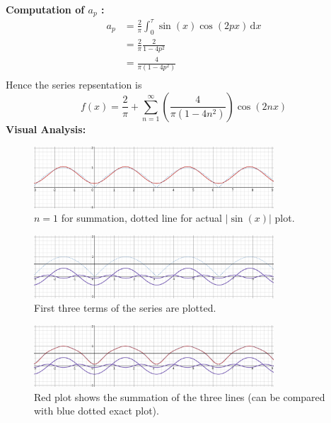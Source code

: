 \documentclass[letterpaper]{article}
\begin{document}
\textbf{Computation of $a_p$ : }
\begin{align*} a_p &=  \frac{2}{\pi }
	\int_{0}^{\tau} \sin(x) \cos(2 p x) \, \mathrm{d}  x   \\
	&= \frac{2}{\pi } \frac{2}{1 - 4p^2} \\
	&= \frac{4}{\pi (1 - 4 p^2)} \\
\end{align*}
Hence the series repsentation is 
\[
\boxed{
f(x) = \frac{2}{ \pi } + \sum_{n=1}^{\infty} \left(\frac{4}{\pi (1- 4n^2 )}\right) \cos(2 n x)
}
\] 
\textbf{Visual Analysis: }
\begin{figure}[H]
	\centering
	\includegraphics[width=0.8\textwidth]{ss/5/p1-1.png}
	\caption{$n = 1$ for summation, dotted line for actual $| \sin(x) |$ plot.}
	\label{fig:ss-5-p1-1-png}
\end{figure}
\begin{figure}[H]
	\centering
	\includegraphics[width=0.8\textwidth]{ss/5/p1-2.png}
	\caption{First three terms of the series are plotted.}
	\label{fig:ss-5-p1-1-png}
\end{figure}
\begin{figure}[H]
	\centering
	\includegraphics[width=0.8\textwidth]{ss/5/p1-3.png}
	\caption{Red plot shows the summation of the three lines (can be compared with blue dotted exact plot).}
	\label{fig:ss-5-p1-1-png}
\end{figure}
\end{document}
